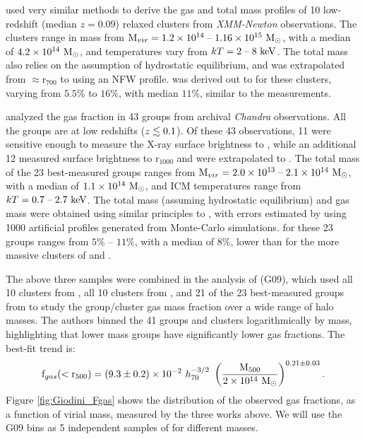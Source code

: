 \textbf{\citet{Arnaud2007}} used very similar methods to derive the
gas and total mass profiles of 10 low-redshift (median $z = 0.09$)
relaxed clusters from \textit{XMM-Newton} observations. The clusters
range in mass from $\textrm{M\ensuremath{_{vir}}} = 1.2\times 10^{14}\;\textrm{--}\;1.16 \times 10^{15}~\textrm{M}_\odot$,
with a median of $4.2 \times 10^{14}~\textrm{M}_\odot$, and temperatures vary from
$kT = 2\;\textrm{--}\;8~\textrm{keV}$. The total mass also relies on the
assumption of hydrostatic equilibrium, and was extrapolated from
$\approx$r$_{700}$ to \rfive{} using an NFW profile.  \fg{} was derived
out to \rfive{} for these clusters, varying from $5.5\%$ to $16\%$,
with median $11\%$, similar to the \citet{Vikhlinin2006} measurements.

\textbf{\citet{Sun2009}} analyzed the gas fraction in 43 groups from
archival \textit{Chandra} observations. All the groups are at low
redshifts ($z \lesssim 0.1$). Of these 43 observations, 11 were sensitive
enough to measure the X-ray surface brightness to \rfive{}, while an
additional 12 measured surface brightness to r$_{1000}$ and were
extrapolated to \rfive{}. The total mass of the 23 best-measured
groups ranges from $\textrm{M\ensuremath{_{vir}}} = 2.0\times 10^{13}\;\textrm{--}\;2.1 \times 10^{14}~\textrm{M}_\odot$, with a
median of $1.1 \times 10^{14}~\textrm{M}_\odot$, and ICM temperatures range from
$kT = 0.7\;\textrm{--}\;2.7~\textrm{keV}$. The total mass (assuming hydrostatic
equilibrium) and gas mass were obtained using similar principles to
\citet{Vikhlinin2006}, with errors estimated by using 1000 artificial
profiles generated from Monte-Carlo simulations. \fgfive{} for
these 23 groups ranges from $5\%$ -- $11\%$, with a median of $8\%$,
lower than for the more massive clusters of \citet{Vikhlinin2006} and
\citet{Arnaud2007}.



The above three samples were combined in the analysis of
\textbf{\citet{Giodini2009}} (G09), which used all 10 clusters from
\citet{Vikhlinin2006}, all 10 clusters from \citet{Arnaud2007}, and 21
of the 23 best-measured groups from \citet{Sun2009} to study the
group/cluster gas mass fraction over a wide range of halo masses. The
authors binned the 41 groups and clusters logarithmically by mass,
highlighting that lower mass groups have significantly lower gas
fractions. The best-fit trend is:
\begin{equation}
\textrm{f\ensuremath{_{gas}}}(<\textrm{r\ensuremath{_{500}}}) = (9.3 \pm 0.2)\times 10^{-2}~h_{70}^{-3/2}~
\left(\frac{\textrm{M\ensuremath{_{500}}}}{2\times 10^{14}~\textrm{M}_\odot}\right)^{0.21 \pm 0.03}.
\end{equation}
Figure \ref{fig:Giodini_Fgas} shows the distribution of the observed
gas fractions, as a function of virial mass, measured by the three
works above. We will use the G09 bins as 5 independent samples of
\fg{} for different masses.

